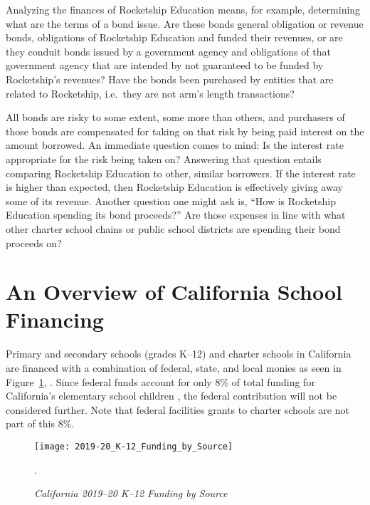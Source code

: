 Analyzing the finances of Rocketship Education means, for example, determining what are the terms of a bond issue. Are these bonds  general obligation or revenue bonds, obligations of Rocketship Education and funded their revenues, or are they conduit bonds issued by a government agency and obligations of that government agency that are intended by not guaranteed to be funded by Rocketship's revenues? Have the bonds been purchased by entities that are related to Rocketship, i.e.~they are not arm's length transactions? 

All bonds are risky to some extent, some more than others, and purchasers of those bonds are compensated for taking on that risk by being paid interest on the amount borrowed. An immediate question comes to mind: Is the interest rate appropriate for the risk being taken on? Answering that question entails comparing Rocketship Education to other, similar borrowers. If the interest rate is higher than expected, then Rocketship Education is effectively giving away some of its revenue. Another question one might ask is, ``How is Rocketship Education spending its bond proceeds?'' Are those expenses in line with what other charter school chains or public school districts are spending their bond proceeds on?

\section{An Overview of California School Financing}\label{sec:ca-overview}\indent

Primary and secondary schools (grades K–12) and charter schools in California are financed with a combination of federal, state, and local monies as seen in Figure~\ref{fig:2019–20_K–12_Funding}, . Since federal funds account for only 8\% of total funding for California's elementary school children \parencite{LAO2021}, the federal contribution will not be considered further. Note that federal facilities grants to charter schools are not part of this 8\%.

\begin{figure}
  \centering
  \caption[California 2019–20 K–12 Funding by Source]{\textit{California 2019–20 K–12 Funding by Source}}\label{fig:2019–20_K–12_Funding}
  \texttt{[image: 2019-20\_K-12\_Funding\_by\_Source]}\\ %
  \footnotesize\raggedright\textcite{LAO2021}.
\end{figure}


